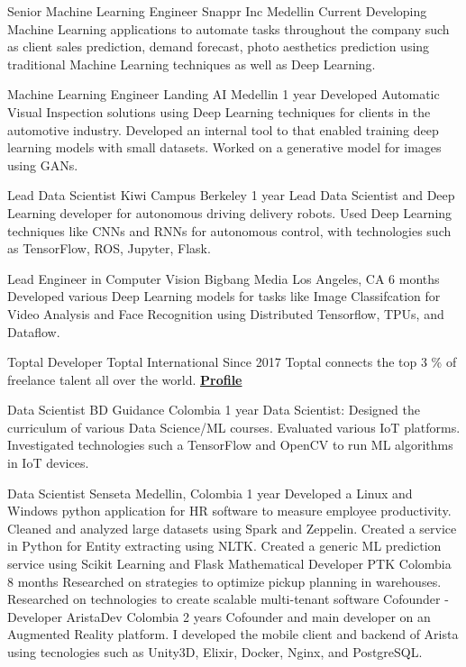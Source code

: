\begin{cventries}

  \cventry
    {Senior Machine Learning Engineer}
    {Snappr Inc}
    {Medellin}
    {Current}
    {
    Developing Machine Learning applications to automate tasks throughout the company such as client sales prediction, demand forecast, photo aesthetics prediction using traditional Machine Learning techniques as well as Deep Learning.
    }

  \cventry
    {Machine Learning Engineer}
    {Landing AI}
    {Medellin}
    {1 year}
    {
    Developed Automatic Visual Inspection solutions using Deep Learning techniques for clients in the automotive industry. Developed an internal tool to that enabled training deep learning models with small datasets. Worked on a generative model for images using GANs.
    }
  
  \cventry
    {Lead Data Scientist}
    {Kiwi Campus}
    {Berkeley}
    {1 year}
    {
    Lead Data Scientist and Deep Learning developer for autonomous driving delivery robots. Used
    Deep Learning techniques like CNNs and RNNs for autonomous control,
    with technologies such as TensorFlow, ROS, Jupyter, Flask.
    }

  \cventry
    {Lead Engineer in Computer Vision}
    {Bigbang Media}
    {Los Angeles, CA}
    {6 months}
    {
    Developed various Deep Learning models for tasks like Image Classifcation for Video Analysis 
    and Face Recognition using Distributed Tensorflow, TPUs, and Dataflow.
    }

  \cventry
    {Toptal Developer}
    {Toptal}
    {International}
    {Since 2017}
    {
      Toptal connects the top 3 \% of freelance talent all over the world. \href{https://www.toptal.com/resume/cristian-garcia}{\textbf{Profile}}
    }

  \cventry
    {Data Scientist}
    {BD Guidance}
    {Colombia}
    {1 year}
    {
    Data Scientist: Designed the curriculum of various
    Data Science/ML courses. Evaluated various IoT platforms. Investigated
    technologies such a TensorFlow and OpenCV to run ML algorithms in IoT
    devices.
    }

  \cventry
    {Data Scientist}
    {Senseta}
    {Medellin, Colombia}
    {1 year}
    {
    Developed a Linux and Windows python
    application for HR software to measure employee productivity. Cleaned
    and analyzed large datasets using Spark and Zeppelin. Created a service in
    Python for Entity extracting using NLTK. Created a generic ML prediction
    service using Scikit Learning and Flask
    }
  \cventry
    {Mathematical Developer}
    {PTK}
    {Colombia}
    {8 months}
    {
    Researched on strategies to optimize
    pickup planning in warehouses. Researched on technologies to create
    scalable multi-tenant software
    }
  \cventry
    {Cofounder - Developer}
    {AristaDev}
    {Colombia}
    {2 years}
    {
    Cofounder and main developer on an
    Augmented Reality platform. I developed the mobile client and backend
    of Arista using tecnologies such as Unity3D, Elixir, Docker, Nginx, and
    PostgreSQL.
    }
\end{cventries}
